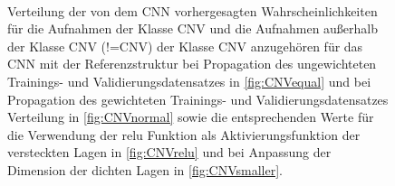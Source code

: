 \begin{figure}
 \centering
  \begin{subfigure}[Ungewichteter Datensatz]{
 \texttt{[image: fig/Appendix\_CNN/CNVornotlogequal.pdf]} \label{fig:CNVequal}}
  \end{subfigure}
 \begin{subfigure}[Gewichteter Datensatz]{
 \texttt{[image: fig/Appendix\_CNN/CNVornotlognormal.pdf]}\label{fig:CNVnormal}}
  \end{subfigure} \\
  \begin{subfigure}[relu statt elu als Aktivierungsfunktion]{
 \texttt{[image: fig/Appendix\_CNN/CNVornotlogrelu.pdf]}\label{fig:CNVrelu}}
  \end{subfigure}
 \begin{subfigure}[Verkleinerte Dimensionen der dichten Lagen]{
 \texttt{[image: fig/Appendix\_CNN/CNVornotlogsmaller.pdf]}\label{fig:CNVsmaller}}
  \end{subfigure}
  \caption{Verteilung der von dem CNN vorhergesagten Wahrscheinlichkeiten für die Aufnahmen der Klasse CNV und die Aufnahmen außerhalb der Klasse CNV (!=CNV) der Klasse CNV anzugehören für das CNN mit der Referenzstruktur bei Propagation des ungewichteten Trainings- und Validierungsdatensatzes in \ref{fig:CNVequal} und bei Propagation des gewichteten Trainings- und Validierungsdatensatzes Verteilung in \ref{fig:CNVnormal} sowie die entsprechenden Werte für die Verwendung der relu Funktion als Aktivierungsfunktion der versteckten Lagen in \ref{fig:CNVrelu} und bei Anpassung der Dimension der dichten Lagen in \ref{fig:CNVsmaller}.}
\end{figure}
\setcounter{subfigure}{0}



